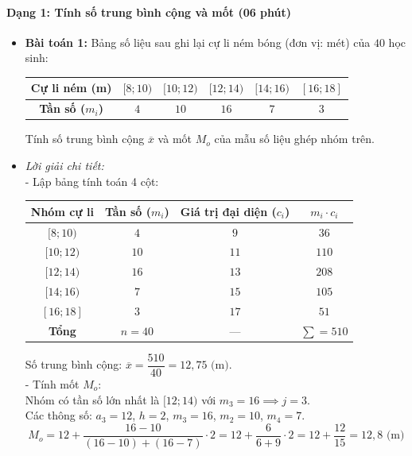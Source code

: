 \documentclass[12pt, a4paper]{article}
\begin{document}
\paragraph{Dạng 1: Tính số trung bình cộng và mốt (06 phút)}
\begin{itemize}
    \item \textbf{Bài toán 1:} Bảng số liệu sau ghi lại cự li ném bóng (đơn vị: mét) của $40$ học sinh:
    \begin{center}
    \begin{tabular}{|c|c|c|c|c|c|}
    \hline
    \textbf{Cự li ném (m)} & $[8; 10)$ & $[10; 12)$ & $[12; 14)$ & $[14; 16)$ & $[16; 18]$ \\
    \hline
    \textbf{Tần số ($m_i$)} & $4$ & $10$ & $16$ & $7$ & $3$ \\
    \hline
    \end{tabular}
    \end{center}
    Tính số trung bình cộng $\overline{x}$ và mốt $M_o$ của mẫu số liệu ghép nhóm trên.
    \item \textit{Lời giải chi tiết:}\\
    - Lập bảng tính toán 4 cột:
    \begin{center}
    \begin{tabular}{|c|c|c|c|}
    \hline
    \textbf{Nhóm cự li} & \textbf{Tần số ($m_i$)} & \textbf{Giá trị đại diện ($c_i$)} & $m_i \cdot c_i$ \\
    \hline
    $[8; 10)$ & $4$ & $9$ & $36$ \\
    $[10; 12)$ & $10$ & $11$ & $110$ \\
    $[12; 14)$ & $16$ & $13$ & $208$ \\
    $[14; 16)$ & $7$ & $15$ & $105$ \\
    $[16; 18]$ & $3$ & $17$ & $51$ \\
    \hline
    \textbf{Tổng} & $n = 40$ & --- & $\sum = 510$ \\
    \hline
    \end{tabular}
    \end{center}
    Số trung bình cộng: $\overline{x} = \dfrac{510}{40} = 12{,}75\text{ (m)}$.\\
    - Tính mốt $M_o$:\\
    Nhóm có tần số lớn nhất là $[12; 14)$ với $m_3 = 16 \implies j = 3$.\\
    Các thông số: $a_3 = 12$, $h = 2$, $m_3 = 16$, $m_2 = 10$, $m_4 = 7$.\\
    $$M_o = 12 + \dfrac{16 - 10}{(16 - 10) + (16 - 7)} \cdot 2 = 12 + \dfrac{6}{6 + 9} \cdot 2 = 12 + \dfrac{12}{15} = 12{,}8\text{ (m)}$$
\end{itemize}
\end{document}
